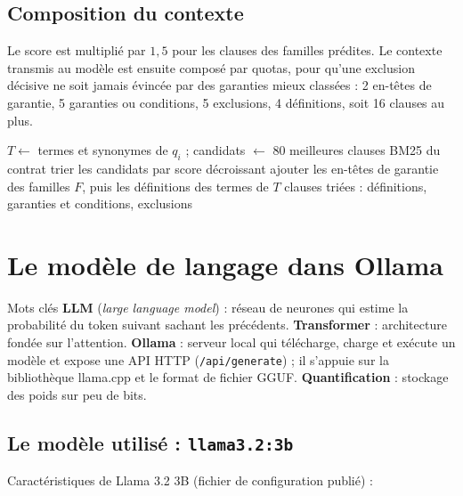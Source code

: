 \documentclass[11pt,a4paper]{article}
\begin{document}
\subsection{Composition du contexte}
Le score est multiplié par $1{,}5$ pour les clauses des familles prédites. Le contexte transmis au
modèle est ensuite composé par quotas, pour qu'une exclusion décisive ne soit jamais évincée par
des garanties mieux classées : 2 en-têtes de garantie, 5 garanties ou conditions, 5 exclusions,
4 définitions, soit 16 clauses au plus.

\begin{algorithm}[h]
\caption{Sélection des clauses d'un contrat}
$T \leftarrow$ termes et synonymes de $q_i$ ; candidats $\leftarrow$ 80 meilleures clauses BM25 du contrat\;
trier les candidats par score décroissant\;
ajouter les en-têtes de garantie des familles $F$, puis les définitions des termes de $T$\;
\Return clauses triées : définitions, garanties et conditions, exclusions\;
\end{algorithm}

\section{Le modèle de langage dans Ollama}

\begin{defbox}{Mots clés}
\textbf{LLM} (\emph{large language model}) : réseau de neurones qui estime la probabilité du token
suivant sachant les précédents. \textbf{Transformer} : architecture fondée sur l'attention.
\textbf{Ollama} : serveur local qui télécharge, charge et exécute un modèle et expose une API HTTP
(\texttt{/api/generate}) ; il s'appuie sur la bibliothèque llama.cpp et le format de fichier
GGUF. \textbf{Quantification} : stockage des poids sur peu de bits.
\end{defbox}

\subsection{Le modèle utilisé : \texttt{llama3.2:3b}}
Caractéristiques de Llama 3.2 3B (fichier de configuration publié) :
\end{document}
